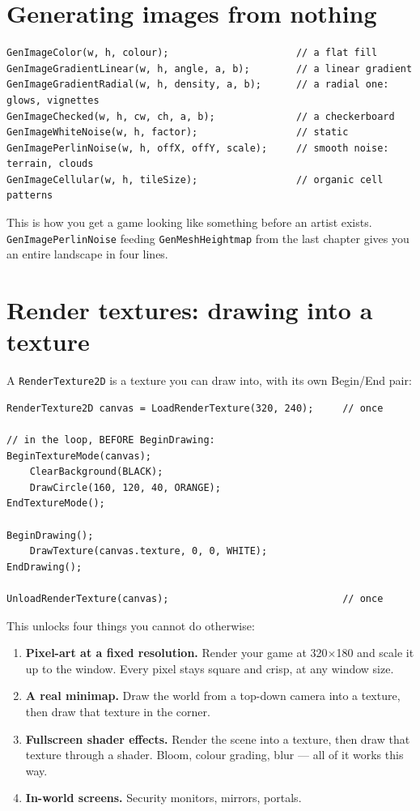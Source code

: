 \section{Generating images from nothing}

\begin{lstlisting}
GenImageColor(w, h, colour);                      // a flat fill
GenImageGradientLinear(w, h, angle, a, b);        // a linear gradient
GenImageGradientRadial(w, h, density, a, b);      // a radial one: glows, vignettes
GenImageChecked(w, h, cw, ch, a, b);              // a checkerboard
GenImageWhiteNoise(w, h, factor);                 // static
GenImagePerlinNoise(w, h, offX, offY, scale);     // smooth noise: terrain, clouds
GenImageCellular(w, h, tileSize);                 // organic cell patterns
\end{lstlisting}

This is how you get a game looking like something before an artist exists.
\lstinline|GenImagePerlinNoise| feeding \lstinline|GenMeshHeightmap| from the
last chapter gives you an entire landscape in four lines.

\section{Render textures: drawing into a texture}

A \lstinline|RenderTexture2D| is a texture you can draw into, with its own
Begin/End pair:

\begin{lstlisting}
RenderTexture2D canvas = LoadRenderTexture(320, 240);     // once

// in the loop, BEFORE BeginDrawing:
BeginTextureMode(canvas);
    ClearBackground(BLACK);
    DrawCircle(160, 120, 40, ORANGE);
EndTextureMode();

BeginDrawing();
    DrawTexture(canvas.texture, 0, 0, WHITE);
EndDrawing();

UnloadRenderTexture(canvas);                              // once
\end{lstlisting}

This unlocks four things you cannot do otherwise:

\begin{enumerate}[leftmargin=*,itemsep=3pt]
  \item \textbf{Pixel-art at a fixed resolution.} Render your game at 320$\times$180
        and scale it up to the window. Every pixel stays square and crisp, at any
        window size.
  \item \textbf{A real minimap.} Draw the world from a top-down camera into a
        texture, then draw that texture in the corner.
  \item \textbf{Fullscreen shader effects.} Render the scene into a texture, then
        draw that texture through a shader. Bloom, colour grading, blur --- all
        of it works this way.
  \item \textbf{In-world screens.} Security monitors, mirrors, portals.
\end{enumerate}

